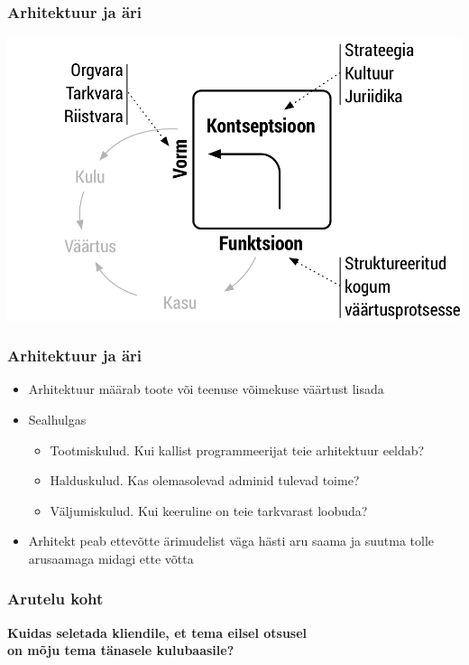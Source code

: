 \begin{frame}[fragile]
  \frametitle{Arhitektuur ja äri}
  	\begin{center}
			\includegraphics[width=.9\textwidth]{ffc_profit.pdf}
	\end{center}
\end{frame}

\begin{frame}[fragile]
	\frametitle{Arhitektuur ja äri}
			\begin{itemize}
				\item Arhitektuur määrab toote või teenuse võimekuse väärtust lisada
				\item Sealhulgas
				\begin{itemize}
					\item Tootmiskulud. Kui kallist programmeerijat teie arhitektuur eeldab?
					\item Halduskulud. Kas olemasolevad adminid tulevad toime?
					\item Väljumiskulud. Kui keeruline on teie tarkvarast loobuda?
				\end{itemize}
				\item Arhitekt peab ettevõtte ärimudelist väga hästi aru saama ja suutma tolle arusaamaga midagi ette võtta
			\end{itemize}
\end{frame}

\begin{frame}
  \frametitle{Arutelu koht}
		\begin{center}
			\textbf{Kuidas seletada kliendile, et tema eilsel otsusel\\ on mõju tema tänasele kulubaasile?}
		\end{center}
\end{frame}

